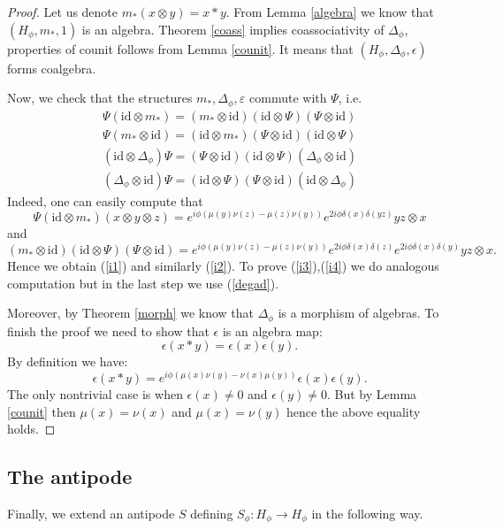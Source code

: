 \documentclass[12pt]{amsart}
\theoremstyle{definition}
\numberwithin{equation}{section}
\begin{document}
\begin{proof}
Let us denote $m_\ast (x\otimes y)=x \ast y$. From Lemma \ref{algebra} we know that $(H_{\phi},m_\ast,1)$ is an algebra. Theorem \ref{coass} implies coassociativity of $\Delta_\phi$, properties of counit follows from Lemma \ref{counit}. It means that $(H_\phi,\Delta_\phi,\epsilon)$ forms coalgebra.

Now, we check that the structures 
$m_\ast,\Delta_{\phi},\varepsilon$ commute with $\Psi$, i.e.
\begin{align}
\Psi(\mathrm{id}\otimes m_\ast)=(m_\ast\otimes \mathrm{id})(\mathrm{id}\otimes \Psi)
(\Psi\otimes \mathrm{id}) \label{i1} \\
\Psi(m_\ast\otimes\mathrm{id})=(\mathrm{id}\otimes m_\ast)(\Psi\otimes\mathrm{id})
(\mathrm{id}\otimes\Psi) \label{i2}\\
(\mathrm{id}\otimes \Delta_{\phi})\Psi=(\Psi\otimes\mathrm{id})(\mathrm{id}\otimes \Psi)(\Delta_{\phi}\otimes \mathrm{id}) \label{i3}\\
(\Delta_{\phi}\otimes\mathrm{id})\Psi=(\mathrm{id}\otimes \Psi)(\Psi\otimes\mathrm{id})(\mathrm{id}\otimes\Delta_{\phi})\label{i4}
\end{align}
Indeed, one can easily compute that
$$\Psi(\mathrm{id}\otimes m_\ast)(x\otimes y\otimes z)=e^{i\phi\left(\mu(y)\nu(z)-\mu(z)\nu(y)\right)}e^{2 i\phi\delta(x)\delta(yz)}yz\otimes x$$ 
and
$$(m_\ast\otimes \mathrm{id})(\mathrm{id}\otimes \Psi)(\Psi\otimes \mathrm{id})=e^{i\phi\left(\mu(y)\nu(z)-\mu(z)\nu(y)\right)}e^{2 i\phi\delta(x)\delta(z)}e^{2 i\phi\delta(x)\delta(y)}yz\otimes x.$$
Hence we obtain (\ref{i1}) and similarly (\ref{i2}). To prove (\ref{i3}),(\ref{i4}) we do analogous computation but in the 
last step we use (\ref{degad}).

Moreover, by Theorem \ref{morph} we know that $\Delta_\phi$ is a morphism of algebras. 
To finish the proof we need to show that $\epsilon$ is an algebra map:
$$ \epsilon( x \ast y) = \epsilon(x) \epsilon(y).$$
By definition we have:
$$ \epsilon( x \ast y) = e^{i \phi(\mu(x) \nu(y)  - \nu(x) \mu(y))} \epsilon(x) \epsilon(y). $$
The only nontrivial case is when $\epsilon(x) \not=0 $ and $\epsilon(y) \not=0$. But by Lemma \ref{counit} then $\mu(x)=\nu(x)$ and $\mu(x)=\nu(y)$ hence the above equality holds.
\end{proof}
\subsection{The antipode}
Finally, we extend an antipode $S$ defining $S_\phi:H_\phi\rightarrow H_{\phi}$ in the following way.
\end{document}
